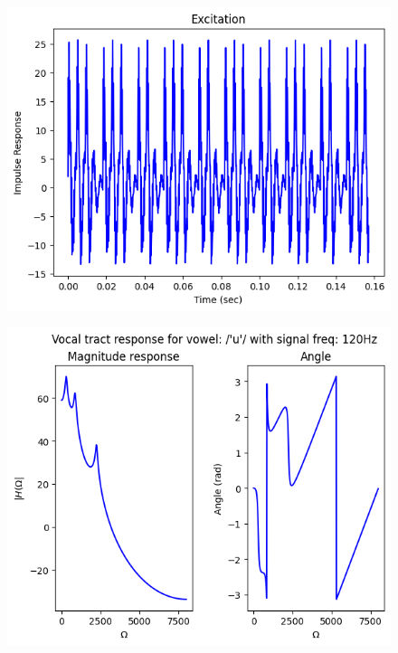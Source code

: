 \documentclass{article}
\begin{document}
\begin{figure}[H]
\begin{center}
\includegraphics[scale = 0.5]{Q4_B2R.png}
\end{center}
\end{figure}


\begin{figure}[H]
\begin{center}
\includegraphics[scale = 0.5]{Q4_C1.png}
\end{center}
\end{figure}
\end{document}
